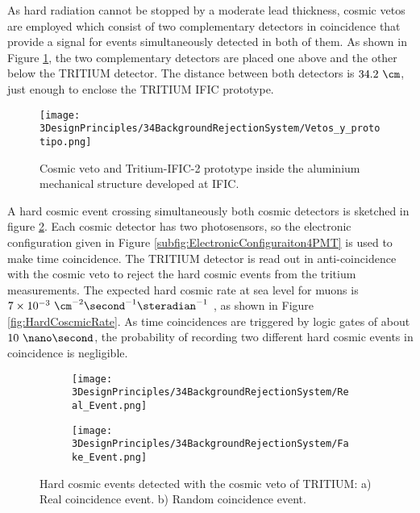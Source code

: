 As hard radiation cannot be stopped by a moderate lead thickness, cosmic vetos are employed which consist of two complementary detectors in coincidence that provide a signal for events simultaneously detected in both of them. As shown in Figure \ref{fig:VetoAndPrototype}, the two complementary detectors are placed one above and the other below the TRITIUM detector. The distance between both detectors is $34.2~\cm$, just enough to enclose the TRITIUM IFIC prototype.

\begin{figure}[h]
\centering
\texttt{[image: 3DesignPrinciples/34BackgroundRejectionSystem/Vetos\_y\_prototipo.png]}
\caption{Cosmic veto and Tritium-IFIC-2 prototype inside the aluminium mechanical structure developed at IFIC.\label{fig:VetoAndPrototype}}
\end{figure}

A hard cosmic event crossing simultaneously both cosmic detectors is sketched in figure \ref{subfig:RealHardCosmicEvent}. Each cosmic detector has two photosensors, so the electronic configuration given in Figure \ref{subfig:ElectronicConfiguraiton4PMT} is used to make time coincidence. The TRITIUM detector is read out in anti-coincidence with the cosmic veto to reject the hard cosmic events from the tritium measurements. The expected hard cosmic rate at sea level for muons is $7\times 10^{-3}~\cm^{-2}\second^{-1}\steradian^{-1}$ \cite{PDG, HardCosmicMuonRate}, as shown in Figure \ref{fig:HardCoscmicRate}. As time coincidences are triggered by logic gates of about $10~\nano\second$, the probability of recording two different hard cosmic events in coincidence is negligible.

\begin{figure}[h]
\centering
    \begin{subfigure}[b]{0.45\textwidth}
    \centering
    \texttt{[image: 3DesignPrinciples/34BackgroundRejectionSystem/Real\_Event.png]}  
    \caption{\label{subfig:RealHardCosmicEvent}}
    \end{subfigure}
    \hfill
    \begin{subfigure}[b]{0.45\textwidth}
    \centering
    \texttt{[image: 3DesignPrinciples/34BackgroundRejectionSystem/Fake\_Event.png]}  
    \caption{\label{subfig:FakeHardCosmicEvent}}
    \end{subfigure}
   \caption{Hard cosmic events detected with the cosmic veto of TRITIUM: a) Real coincidence event. b) Random coincidence event.}
 \label{fig:HardCosmicEventsSimulation}
\end{figure}

